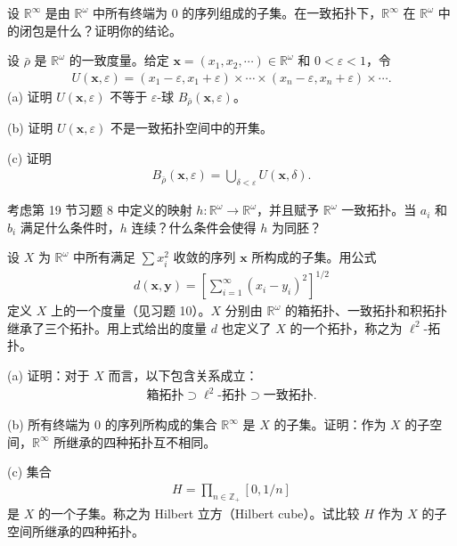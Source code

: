 \documentclass[../../main.tex]{subfiles}
\begin{document}
\begin{exercise}\label{exercise:ch02-度量拓扑-5}
设 $\mathbb{R}^{\infty}$ 是由 $\mathbb{R}^{\omega}$ 中所有终端为 0 的序列组成的子集。在一致拓扑下，$\mathbb{R}^{\infty}$ 在 $\mathbb{R}^{\omega}$ 中的闭包是什么？证明你的结论。
\end{exercise}

\begin{exercise}\label{exercise:ch02-度量拓扑-6}
设 $\bar{\rho}$ 是 $\mathbb{R}^{\omega}$ 的一致度量。给定 $\boldsymbol{x} = (x_{1}, x_{2}, \cdots) \in \mathbb{R}^{\omega}$ 和 $0 < \varepsilon < 1$，令
\begin{align*}
U(\boldsymbol{x}, \varepsilon) = (x_{1} - \varepsilon, x_{1} + \varepsilon) \times \cdots \times (x_{n} - \varepsilon, x_{n} + \varepsilon) \times \cdots.
\end{align*}
(a) 证明 $U(\boldsymbol{x}, \varepsilon)$ 不等于 $\varepsilon$-球 $B_{\bar{\rho}}(\boldsymbol{x}, \varepsilon)$。

(b) 证明 $U(\boldsymbol{x}, \varepsilon)$ 不是一致拓扑空间中的开集。

(c) 证明
\begin{align*}
B_{\bar{\rho}}(\boldsymbol{x}, \varepsilon) = \bigcup_{\delta < \varepsilon} U(\boldsymbol{x}, \delta).
\end{align*}
\end{exercise}

\begin{exercise}\label{exercise:ch02-度量拓扑-7}
考虑第 19 节习题 8 中定义的映射 $h: \mathbb{R}^{\omega} \rightarrow \mathbb{R}^{\omega}$，并且赋予 $\mathbb{R}^{\omega}$ 一致拓扑。当 $a_{i}$ 和 $b_{i}$ 满足什么条件时，$h$ 连续？什么条件会使得 $h$ 为同胚？
\end{exercise}

\begin{exercise}\label{exercise:ch02-度量拓扑-8}
设 $X$ 为 $\mathbb{R}^{\omega}$ 中所有满足 $\sum x_{i}^{2}$ 收敛的序列 $\boldsymbol{x}$ 所构成的子集。用公式
\begin{align*}
d(\boldsymbol{x}, \boldsymbol{y}) = \left[\sum_{i=1}^{\infty} (x_{i} - y_{i})^{2}\right]^{1/2}
\end{align*}
定义 $X$ 上的一个度量（见习题 10）。$X$ 分别由 $\mathbb{R}^{\omega}$ 的箱拓扑、一致拓扑和积拓扑继承了三个拓扑。用上式给出的度量 $d$ 也定义了 $X$ 的一个拓扑，称之为 $\ell^{2}$-拓扑。

(a) 证明：对于 $X$ 而言，以下包含关系成立：
\begin{align*}
\text{箱拓扑} \supset \ell^{2}\text{-拓扑} \supset \text{一致拓扑}.
\end{align*}

(b) 所有终端为 0 的序列所构成的集合 $\mathbb{R}^{\infty}$ 是 $X$ 的子集。证明：作为 $X$ 的子空间，$\mathbb{R}^{\infty}$ 所继承的四种拓扑互不相同。

(c) 集合
\begin{align*}
H = \prod_{n \in \mathbb{Z}_{+}} [0, 1/n]
\end{align*}
是 $X$ 的一个子集。称之为 Hilbert 立方（Hilbert cube）。试比较 $H$ 作为 $X$ 的子空间所继承的四种拓扑。
\end{exercise}
\end{document}
